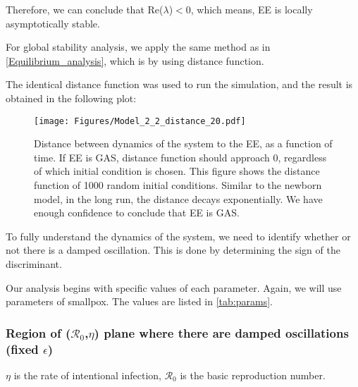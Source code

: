 \documentclass[12pt]{article}
\newcommand{\R}{\mathcal{R}}
\begin{document}
Therefore, we can conclude that Re($\lambda$)$<0$, which means, EE is locally asymptotically stable.

For global stability analysis, we apply the same method as in \autoref{Equilibrium_analysis}, which is by using distance function.

The identical distance function was used to run the simulation, and the result is obtained in the following plot:

\begin{figure}[H]
  \centering
  \texttt{[image: Figures/Model\_2\_2\_distance\_20.pdf]}
  \caption{Distance between dynamics of the system to the EE, as a function of time. If EE is GAS, distance function should approach 0, regardless of which initial condition is chosen. This figure shows the distance function of 1000 random initial conditions. Similar to the newborn model, in the long run, the distance decays exponentially. We have enough confidence to conclude that EE is GAS.}
\end{figure}

To fully understand the dynamics of the system, we need to identify whether or not there is a damped oscillation. This is done by determining the sign of the discriminant.

Our analysis begins with specific values of each parameter. Again, we will use parameters of smallpox. The values are listed in \autoref{tab:params}.
\subsubsection{Region of ($\R_0$,$\eta$) plane where there are damped oscillations (fixed $\epsilon$)}

$\eta$ is the rate of intentional infection, $\R_0$ is the basic reproduction number.
\end{document}
